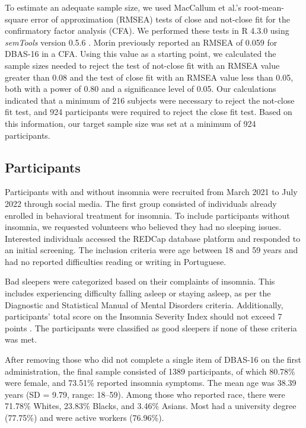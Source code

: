 \documentclass[
  12pt,
  twoside,
  openright,
  a4paper,
  chapter=TITLE,
  section=TITLE,
  brazil]{abntex2}
\begin{document}
To estimate an adequate sample size, we used MacCallum et al.'s
\autocite*{maccallum1996} root-mean-square error of approximation
(RMSEA) tests of close and not-close fit for the confirmatory factor
analysis (CFA). We performed these tests in R 4.3.0 \autocite{R-base}
using \emph{semTools} version 0.5.6 \autocite{semtools}. Morin
\autocite*{morin2007a} previously reported an RMSEA of 0.059 for DBAS-16
in a CFA. Using this value as a starting point, we calculated the sample
sizes needed to reject the test of not-close fit with an RMSEA value
greater than 0.08 and the test of close fit with an RMSEA value less
than 0.05, both with a power of 0.80 and a significance level of 0.05.
Our calculations indicated that a minimum of 216 subjects were necessary
to reject the not-close fit test, and 924 participants were required to
reject the close fit test. Based on this information, our target sample
size was set at a minimum of 924 participants.

\hypertarget{participants}{%
\subsection{Participants}\label{participants}}

Participants with and without insomnia were recruited from March 2021 to
July 2022 through social media. The first group consisted of individuals
already enrolled in behavioral treatment for insomnia. To include
participants without insomnia, we requested volunteers who believed they
had no sleeping issues. Interested individuals accessed the REDCap
database platform and responded to an initial screening. The inclusion
criteria were age between 18 and 59 years and had no reported
difficulties reading or writing in Portuguese.

Bad sleepers were categorized based on their complaints of insomnia.
This includes experiencing difficulty falling asleep or staying asleep,
as per the Diagnostic and Statistical Manual of Mental Disorders
\autocite{americanpsychiatricassociation2013} criteria. Additionally,
participants' total score on the Insomnia Severity Index should not
exceed 7 points \autocite{bastien2001}. The participants were classified
as good sleepers if none of these criteria was met.

After removing those who did not complete a single item of DBAS-16 on
the first administration, the final sample consisted of 1389
participants, of which 80.78\% were female, and 73.51\% reported
insomnia symptoms. The mean age was 38.39 years (SD = 9.79, range:
18--59). Among those who reported race, there were 71.78\% Whites,
23.83\% Blacks, and 3.46\% Asians. Most had a university degree
(77.75\%) and were active workers (76.96\%).
\end{document}
